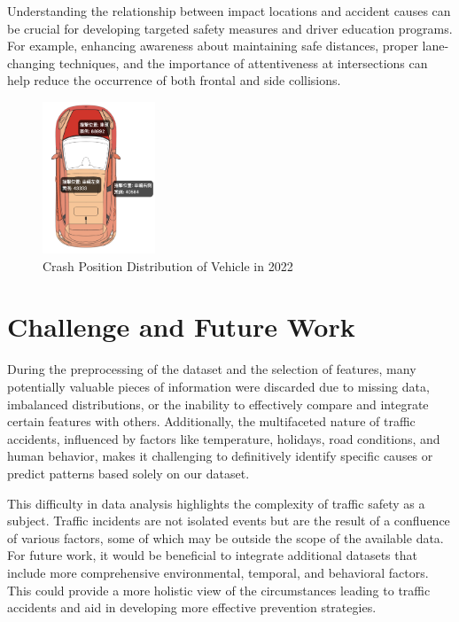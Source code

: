 \documentclass[a4paper, oneside, final, 12pt]{scrartcl} %
\begin{document}
Understanding the relationship between impact locations and 
accident causes can be crucial for developing targeted safety 
measures and driver education programs. For example, 
enhancing awareness about maintaining safe distances, 
proper lane-changing techniques, and the importance of attentiveness 
at intersections can help reduce the occurrence of both frontal and side collisions.

\begin{figure}[htbp]
  \centering
  \includegraphics[width=0.3\textwidth]{"./Image/insight_position.png"}
  \caption{Crash Position Distribution of Vehicle in 2022}
  \label{fig: insight_crash}
\end{figure}

\section{Challenge and Future Work}

During the preprocessing of the dataset and the selection of features, 
many potentially valuable pieces of information were discarded due to missing data, 
imbalanced distributions, or the inability to effectively compare and 
integrate certain features with others. Additionally, 
the multifaceted nature of traffic accidents, 
influenced by factors like temperature, holidays, road conditions, 
and human behavior, makes it challenging to definitively identify specific 
causes or predict patterns based solely on our dataset.

This difficulty in data analysis highlights the complexity of traffic safety as a subject. 
Traffic incidents are not isolated events but are the result of a 
confluence of various factors, some of which may be outside the scope of the available data. 
For future work, it would be beneficial to integrate additional datasets 
that include more comprehensive environmental, temporal, and behavioral factors. 
This could provide a more holistic view of the circumstances leading to 
traffic accidents and aid in developing more effective prevention strategies.
\end{document}
